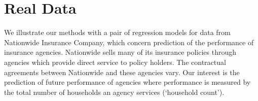 \documentclass[ba]{imsart}
\newcommand{\by}{\mbox{\boldmath $y$}}
\begin{document}
\section{Real Data}
\label{RealData}
We illustrate our methods with a pair of regression models for data from Nationwide Insurance Company, which concern prediction of the performance of insurance agencies.
%
Nationwide sells many of its insurance policies through agencies which provide direct service to policy holders.  
The contractual agreements between Nationwide and these agencies vary.  Our interest is the prediction of future performance of agencies where  performance is measured by the total number of households an agency services (`household count'). 
\end{document}
